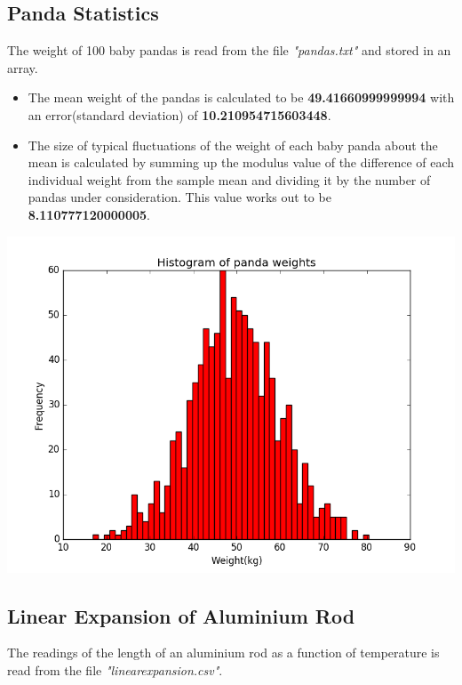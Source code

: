\documentclass{extarticle}
\begin{document}
	\subsection{\color{MidnightBlue} Panda Statistics}
		The weight of 100 baby pandas is read from the file \emph{"pandas.txt"} and stored in an array.
		\begin{itemize}
		\item The mean weight of the pandas is calculated to be \textbf{49.41660999999994} with an error(standard deviation) of 			\textbf{10.210954715603448}.
		\item The size of typical fluctuations of the weight of each baby panda about the mean is calculated by summing up the 				modulus value of the difference of each individual weight from the sample mean and dividing it by the number of 			pandas under consideration. This value works out to be \textbf{8.110777120000005}.
		\end{itemize}
		\includegraphics[scale=0.75]{panda_hist}
	
		\newpage

	\subsection{\color{MidnightBlue} Linear Expansion of Aluminium Rod}
		The readings of the length of an aluminium rod as a function of temperature is read from the file
		\emph{"linearexpansion.csv"}.
		
\end{document}
